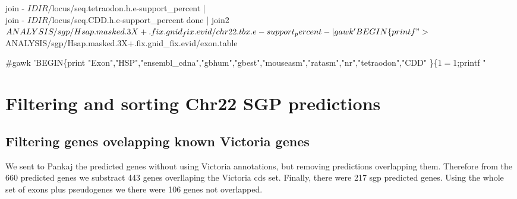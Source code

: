 \documentclass[11pt]{article}
\def\nwendcode{\endtrivlist \endgroup} %
\let\nwdocspar=\par                    %
\newcommand{\sctn}[1]{\section{#1}}
\newcommand{\subsctn}[1]{\subsection{#1}}
\begin{document}
      join - $IDIR/$locus/seq.tetraodon.h.e-support_percent | \\
      join - $IDIR/$locus/seq.CDD.h.e-support_percent
done | join2 $ANALYSIS/sgp/Hsap.masked.3X+.fix.gnid_fix.evid/chr22.tbx.e-support_percent -  | \\
gawk 'BEGIN\{printf "%
> $ANALYSIS/sgp/Hsap.masked.3X+.fix.gnid_fix.evid/exon.table 

#gawk 'BEGIN\{print "Exon","HSP","ensembl_cdna","gbhum","gbest","mouseasm","ratasm","nr","tetraodon","CDD" \}\{$1=$1;printf " %

\nwendcode{}\nwdocspar

\sctn{Filtering and sorting Chr22 SGP predictions}

\subsctn{Filtering genes ovelapping known Victoria genes}
We sent to Pankaj the predicted genes without using Victoria annotations, but removing predictions overlapping them.
Therefore from the 660 predicted genes we substract 443 genes overllaping the Victoria cds set. Finally, there were 217 sgp predicted genes. Using the whole set of exons plus pseudogenes we there were 106 genes not overlapped. 
\end{document}
